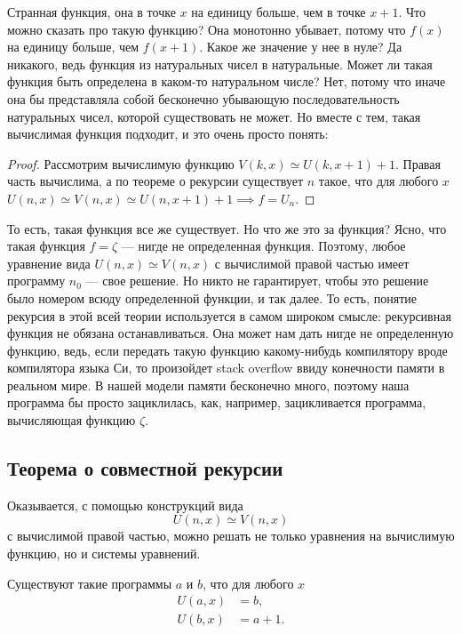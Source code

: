 Странная функция, она в точке $x$ на единицу больше, чем в точке $x + 1$.
Что можно сказать про такую функцию?
Она монотонно убывает, потому что $f(x)$ на единицу больше, чем $f(x + 1)$.
Какое же значение у нее в нуле?
Да никакого, ведь функция из натуральных чисел в натуральные.
Может ли такая функция быть определена в каком-то натуральном числе?
Нет, потому что иначе она бы представляла собой бесконечно убывающую последовательность натуральных чисел, которой существовать не может.
Но вместе с тем, такая вычислимая функция подходит, и это очень просто понять:

\begin{proof}
    Рассмотрим вычислимую функцию $V\left(k, x\right) \simeq U(k, x + 1) + 1$.
    Правая часть вычислима, а по теореме о рекурсии существует $n$ такое, что для любого $x$ $U(n, x) \simeq V(n, x) \simeq U(n, x + 1)  + 1 \implies f = U_{n}$.
\end{proof}

То есть, такая функция все же существует.
Но что же это за функция?
Ясно, что такая функция $f = \zeta$ --- нигде не определенная функция.
Поэтому, любое уравнение вида $U(n, x) \simeq V(n, x)$ с вычислимой правой частью имеет программу $n_{0}$ --- свое решение.
Но никто не гарантирует, чтобы это решение было номером всюду определенной функции, и так далее.
То есть, понятие рекурсия в этой всей теории используется в самом широком смысле: рекурсивная функция не обязана останавливаться.
Она может нам дать нигде не определенную функцию, ведь, если передать такую функцию какому-нибудь компилятору вроде компилятора языка Си, то произойдет stack overflow ввиду конечности памяти в реальном мире.
В нашей модели памяти бесконечно много, поэтому наша программа бы просто зациклилась, как, например, зацикливается программа, вычисляющая функцию $\zeta$.

\subsection{Теорема о совместной рекурсии}

Оказывается, с помощью конструкций вида
$$
    U(n, x) \simeq V(n, x)
$$
с вычислимой правой частью, можно решать не только уравнения на вычислимую функцию, но и системы уравнений.

\begin{example}
    Существуют такие программы $a$ и $b$, что для любого $x$
    \begin{align}
        U(a, x) &= b, \\
        U(b, x) &= a + 1.
    \end{align}
\end{example}

